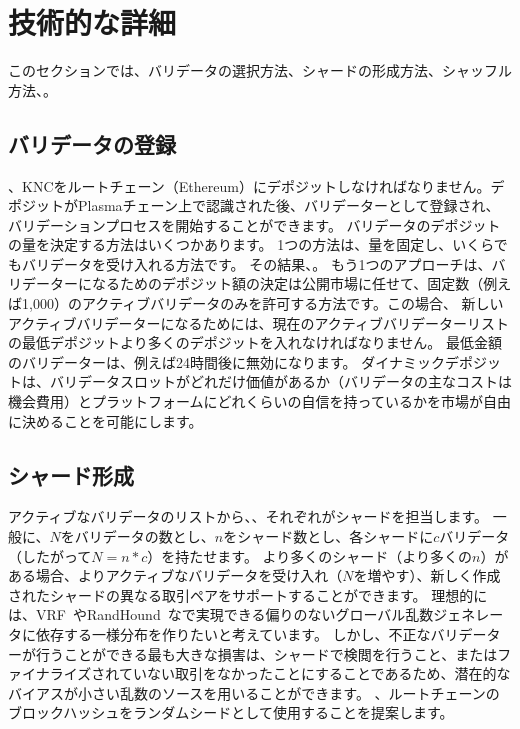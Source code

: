 \section{技術的な詳細}
\label{sec:details}

このセクションでは、バリデータの選択方法、シャードの形成方法、シャッフル方法、。

\subsection{バリデータの登録}
、KNCをルートチェーン（Ethereum）にデポジットしなければなりません。デポジットがPlasmaチェーン上で認識された後、バリデーターとして登録され、バリデーションプロセスを開始することができます。 バリデータのデポジットの量を決定する方法はいくつかあります。 1つの方法は、量を固定し、いくらでもバリデータを受け入れる方法です。 その結果、。 もう1つのアプローチは、バリデーターになるためのデポジット額の決定は公開市場に任せて、固定数（例えば1,000）のアクティブバリデータのみを許可する方法です。この場合、 新しいアクティブバリデーターになるためには、現在のアクティブバリデーターリストの最低デポジットより多くのデポジットを入れなければなりません。 最低金額のバリデーターは、例えば24時間後に無効になります。 ダイナミックデポジットは、バリデータスロットがどれだけ価値があるか（バリデータの主なコストは機会費用）とプラットフォームにどれくらいの自信を持っているかを市場が自由に決めることを可能にします。

\subsection{シャード形成}
アクティブなバリデータのリストから、、それぞれがシャードを担当します。 一般に、$N$をバリデータの数とし、$n$をシャード数とし、各シャードに$c$バリデータ（したがって$N = n*c$）を持たせます。 より多くのシャード（より多くの$n$）がある場合、よりアクティブなバリデータを受け入れ（$N$を増やす）、新しく作成されたシャードの異なる取引ペアをサポートすることができます。 理想的には、VRF~\cite{algorand}やRandHound~\cite{randhound}なで実現できる偏りのないグローバル乱数ジェネレータに依存する一様分布を作りたいと考えています。 しかし、不正なバリデーターが行うことができる最も大きな損害は、シャードで検閲を行うこと、またはファイナライズされていない取引をなかったことにすることであるため、潜在的なバイアスが小さい乱数のソースを用いることができます。 、ルートチェーンのブロックハッシュをランダムシードとして使用することを提案します。

